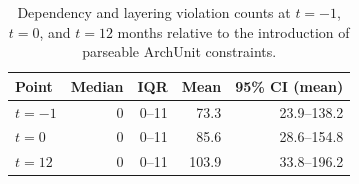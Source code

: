 \begin{table}[t]
\centering
\caption{Dependency and layering violation counts at $t={-}1$, $t=0$, and $t=12$ months relative to the introduction of parseable ArchUnit constraints.}
\label{tab:rq4_trajectories}
\small
\setlength{\tabcolsep}{3.5pt}
\setlength{\aboverulesep}{0pt}
\setlength{\belowrulesep}{0pt}
\renewcommand{\arraystretch}{1.25}
\begin{tabular}{@{}lrrrr@{}}
\toprule
\textbf{Point} & \textbf{Median} & \textbf{IQR} & \textbf{Mean} & \textbf{95\% CI (mean)} \\
\midrule
\rowcolor{rowband}
$t{=}{-}1$ & 0 & 0--11 & 73.3 & 23.9--138.2 \\
$t{=}0$ & 0 & 0--11 & 85.6 & 28.6--154.8 \\
\rowcolor{rowband}
$t{=}12$ & 0 & 0--11 & 103.9 & 33.8--196.2 \\
\bottomrule
\end{tabular}
\end{table}
